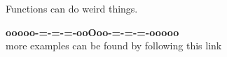 \documentclass{ximera}
\begin{document}
Functions can do weird things.










\begin{center}
\textbf{\textcolor{green!50!black}{ooooo-=-=-=-ooOoo-=-=-=-ooooo}} \\

more examples can be found by following this link\\ 

\end{center}
\end{document}
